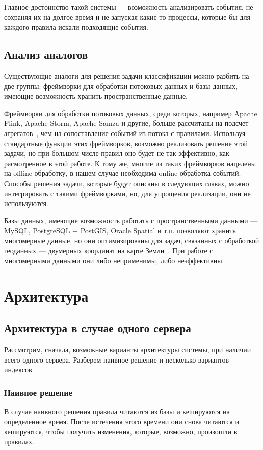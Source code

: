 \documentclass[14pt]{article}
\begin{document}
Главное достоинство такой системы --- возможность анализировать события, не сохраняя их на долгое время и не запуская какие-то процессы, которые бы для каждого правила искали подходящие события.

\subsection{Анализ аналогов}
Существующие аналоги для решения задачи классификации можно разбить на две группы: фреймворки для обработки потоковых данных и базы данных, имеющие возможность хранить пространственные данные.

Фреймворки для обработки потоковых данных, среди которых, например Apache Flink, Apache Storm, Apache Samza и другие, больше рассчитаны на подсчет агрегатов~\cite{flink-use-cases, storm-documentation, samza-streams-api}, чем на сопоставление событий из потока с правилами. Используя стандартные функции этих фреймворков, возможно реализовать решение этой задачи, но при большом числе правил оно будет не так эффективно, как расмотренное в этой работе. К тому же, многие из таких фреймворков нацелены на offline-обработку, в нашем случае необходима online-обработка событий. Способы решения задачи, которые будут описаны в следующих главах, можно интегрировать с такими фреймворками, но, для упрощения реализации, они не используются.

Базы данных, имеющие возможность работать с пространственными данными --- MySQL, PostgreSQL + PostGIS, Oracle Spatial и т.п. позволяют хранить многомерные данные, но они оптимизированы для задач, связанных с обработкой геоданных --- двумерных координат на карте Земли~\cite{mysql-spatial, postgis, oracle-spatial}. При работе с многомерными данными они либо неприменимы, либо неэффективны.

\section{Архитектура}
\subsection{Архитектура в случае одного сервера}
Рассмотрим, сначала, возможные варианты архитектуры системы, при наличии всего одного сервера. Разберем наивное решение и несколько вариантов индексов.

\subsubsection{Наивное решение}
В случае наивного решения правила читаются из базы и кешируются на определенное время. После истечения этого времени они снова читаются и кешируются, чтобы получить изменения, которые, возможно, произошли в правилах.
\end{document}
